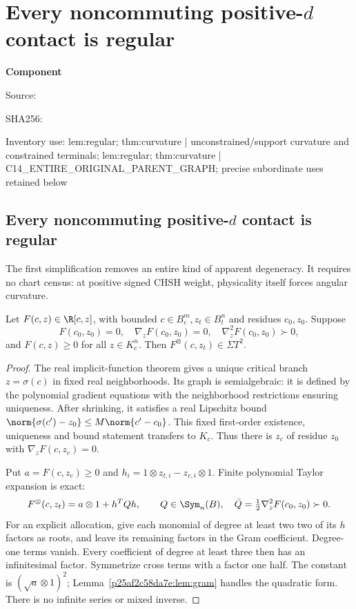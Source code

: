 \chapter{Every noncommuting positive-$d$ contact is regular}
\label{component:pe25c50379365}
\noindent\textbf{Component }\par
{\small\noindent Source: \par}
{\small\noindent SHA256: \par}
{\small\noindent Inventory use: lem:regular; thm:curvature | unconstrained/support curvature and constrained terminals; lem:regular; thm:curvature | C14\_\allowbreak{}ENTIRE\_\allowbreak{}ORIGINAL\_\allowbreak{}PARENT\_\allowbreak{}GRAPH; precise subordinate uses retained below\par}
\medskip
\section{Every noncommuting positive-$d$ contact is regular}\label{pe25c50379365:sec:regular}
The first simplification removes an entire kind of apparent degeneracy. It requires no chart census: at positive signed CHSH weight, physicality itself forces angular curvature.

\begin{lemma}\label{pe25c50379365:lem:regular}
Let $F(c,z)\in\R[c,z]$, with bounded $c\in B_c^m,z_t\in B_t^n$ and residues $c_0,z_0$. Suppose
\[
F(c_0,z_0)=0,\quad \nabla_zF(c_0,z_0)=0,\quad
\nabla_z^2F(c_0,z_0)\succ0,
\]
and $F(c,z)\ge0$ for all $z\in K_c^n$. Then $F^\otimes(c,z_t)\in\Sigma T^2$.
\end{lemma}
\begin{proof}
The real implicit-function theorem gives a unique critical branch $z=\sigma(c)$ in fixed real neighborhoods. Its graph is semialgebraic: it is defined by the polynomial gradient equations with the neighborhood restrictions ensuring uniqueness. After shrinking, it satisfies a real Lipschitz bound $\norm{\sigma(c')-z_0}\le M\norm{c'-c_0}$. This fixed first-order existence, uniqueness and bound statement transfers to $K_c$. Thus there is $z_c$ of residue $z_0$ with $\nabla_zF(c,z_c)=0$.

Put $a=F(c,z_c)\ge0$ and $h_i=1\otimes z_{t,i}-z_{c,i}\otimes1$. Finite polynomial Taylor expansion is exact:
\[
F^\otimes(c,z_t)=a\otimes1+h^TQh,\qquad
Q\in\Sym_n(B),\quad\bar Q=\tfrac12\nabla_z^2F(c_0,z_0)\succ0.
\]
For an explicit allocation, give each monomial of degree at least two two of its $h$ factors as roots, and leave its remaining factors in the Gram coefficient. Degree-one terms vanish. Every coefficient of degree at least three then has an infinitesimal factor. Symmetrize cross terms with a factor one half. The constant is $(\sqrt a\otimes1)^2$; Lemma~\ref{p25af2c58da7e:lem:gram} handles the quadratic form. There is no infinite series or mixed inverse.
\end{proof}

